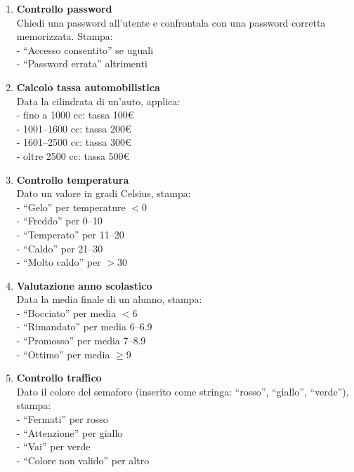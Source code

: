 \documentclass{article}
\begin{document}
\begin{enumerate}
    \item \textbf{Controllo password} \\
    Chiedi una password all'utente e confrontala con una password corretta memorizzata. Stampa: \\
    \quad - ``Accesso consentito'' se uguali \\
    \quad - ``Password errata'' altrimenti
    
    \item \textbf{Calcolo tassa automobilistica} \\
    Data la cilindrata di un'auto, applica: \\
    \quad - fino a 1000 cc: tassa 100€ \\
    \quad - 1001--1600 cc: tassa 200€ \\
    \quad - 1601--2500 cc: tassa 300€ \\
    \quad - oltre 2500 cc: tassa 500€
    
    \item \textbf{Controllo temperatura} \\
    Dato un valore in gradi Celsius, stampa: \\
    \quad - ``Gelo'' per temperature $<0$ \\
    \quad - ``Freddo'' per 0--10 \\
    \quad - ``Temperato'' per 11--20 \\
    \quad - ``Caldo'' per 21--30 \\
    \quad - ``Molto caldo'' per $>30$
    
    \item \textbf{Valutazione anno scolastico} \\
    Data la media finale di un alunno, stampa: \\
    \quad - ``Bocciato'' per media $<6$ \\
    \quad - ``Rimandato'' per media 6--6.9 \\
    \quad - ``Promosso'' per media 7--8.9 \\
    \quad - ``Ottimo'' per media $\geq 9$
    
    \item \textbf{Controllo traffico} \\
    Dato il colore del semaforo (inserito come stringa: ``rosso'', ``giallo'', ``verde''), stampa: \\
    \quad - ``Fermati'' per rosso \\
    \quad - ``Attenzione'' per giallo \\
    \quad - ``Vai'' per verde \\
    \quad - ``Colore non valido'' per altro
\end{enumerate}
\end{document}
